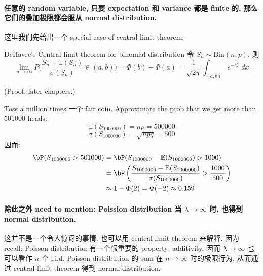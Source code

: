 \paragraph*{任意的 random variable, 只要 expectation 和 variance 都是 finite 的, 
那么它们的叠加极限都会服从 normal distribution.\\}

这里我们先给出一个 special case of central limit theorem:
\begin{theorem}{DeHavre's Central limit theorem for binomial distribution}
令 \(S_n \sim \text{Bin}(n, p)\), 则
    \[
    \lim_{n\to \infty} P\Bigg( \frac{S_n - \mathbb{E}(S_n)}{\sigma(S_n)} \in (a,b)\Bigg) = \Phi(b) - \Phi(a) = \frac{1}{\sqrt{2\pi}} \int_{(a,b)} e^{-\frac{x^2}{2}} \; dx
    \]
\end{theorem}
(Proof: later chapters.)

\begin{example}
    Toss a million times 一个 fair coin. Approximate the prob that we get more than $501000$ heads: 
    \[
    \mathbb{E}(S_{1000000}) = np = 500000
    \]
    \[
    \sigma(S_{1000000}) = \sqrt{npq} = 500
    \] 因而:
    \begin{align*}
        \bP(S_{1000000} > 501000) &= \bP(S_{1000000} - \mathbb{E}(S_{1000000}) > 1000) \\
    &= \bP\left(\frac{S_{1000000} - \mathbb{E}(S_{1000000})}{\sigma(S_{1000000})} > \frac{1000}{500}\right)  \\
    &\approx 1-\Phi(2) = \Phi(-2)  \approx 0.159 
    \end{align*}
\end{example}

\paragraph*{除此之外 need to mention: Poission distribution 当 \(\lambda \to \infty\) 时, 
也得到 normal distribution.\\}
这并不是一个令人惊讶的事情. 也可以用 central limit theorem 来解释. 
因为 recall: Poisson distribution 有一个很重要的 property: additivity. 
因而 \(\lambda \to \infty\) 也可以看作 
\(n\) 个 i.i.d. Poisson distribution 的 sum 在 \(n\to \infty \) 时的极限行为, 
从而通过 central limit theorem 得到 normal distribution.



